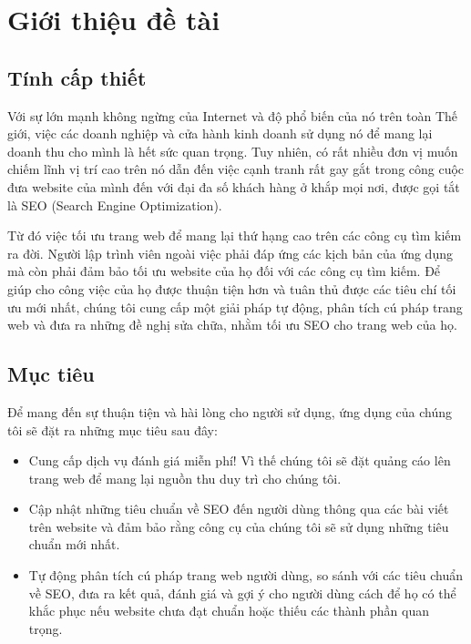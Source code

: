 \chapter{Giới thiệu đề tài}
\section{Tính cấp thiết}
Với sự lớn mạnh không ngừng của Internet và độ phổ biến của nó trên toàn Thế giới, việc các doanh nghiệp và cửa hành kinh doanh sử dụng nó để mang lại doanh thu cho mình là hết sức quan trọng. Tuy nhiên, có rất nhiều đơn vị muốn chiếm lĩnh vị trí cao trên nó dẫn đến việc cạnh tranh rất gay gắt trong công cuộc đưa website của mình đến với đại đa số khách hàng ở khắp mọi nơi, được gọi tắt là SEO (Search Engine Optimization).
\par
Từ đó việc tối ưu trang web để mang lại thứ hạng cao trên các công cụ tìm kiếm ra đời. Người lập trình viên ngoài việc phải đáp ứng các kịch bản của ứng dụng mà còn phải đảm bảo tối ưu website của họ đối với các công cụ tìm kiếm. Để giúp cho công việc của họ được thuận tiện hơn và tuân thủ được các tiêu chí tối ưu mới nhất, chúng tôi cung cấp một giải pháp tự động, phân tích cú pháp trang web và đưa ra những đề nghị sửa chữa, nhằm tối ưu SEO cho trang web của họ.
\section{Mục tiêu}
Để mang đến sự thuận tiện và hài lòng cho người sử dụng, ứng dụng của chúng tôi sẽ đặt ra những mục tiêu sau đây:
\begin{itemize}
	\item Cung cấp dịch vụ đánh giá miễn phí! Vì thế chúng tôi sẽ đặt quảng cáo lên trang web để mang lại nguồn thu duy trì cho chúng tôi.
	\item Cập nhật những tiêu chuẩn về SEO đến người dùng thông qua các bài viết trên website và đảm bảo rằng công cụ của chúng tôi sẽ sử dụng những tiêu chuẩn mới nhất.
	\item Tự động phân tích cú pháp trang web người dùng, so sánh với các tiêu chuẩn về SEO, đưa ra kết quả, đánh giá và gợi ý cho người dùng cách để họ có thể khắc phục nếu website chưa đạt chuẩn hoặc thiếu các thành phần quan trọng.
\end{itemize}

